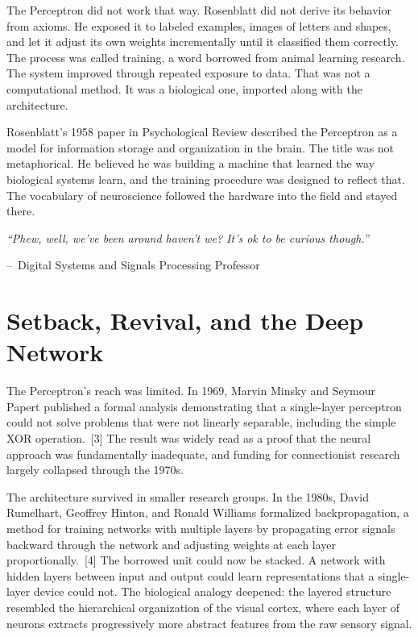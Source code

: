 \documentclass[11pt,a4paper]{article}
\renewenvironment{quote}
  {\list{}{\leftmargin=2.2em\rightmargin=2.2em\topsep=0.4em\parsep=0.3em}%
   \item\relax\itshape}
  {\endlist}
\newcommand{\attrib}[1]{\par\vspace{0.2em}\normalfont\small\hspace*{0em}--\ #1\par}
\begin{document}
The Perceptron did not work that way. Rosenblatt did not derive its behavior from axioms. He exposed it to labeled examples, images of letters and shapes, and let it adjust its own weights incrementally until it classified them correctly. The process was called training, a word borrowed from animal learning research. The system improved through repeated exposure to data. That was not a computational method. It was a biological one, imported along with the architecture.

Rosenblatt's 1958 paper in Psychological Review described the Perceptron as a model for information storage and organization in the brain. The title was not metaphorical. He believed he was building a machine that learned the way biological systems learn, and the training procedure was designed to reflect that. The vocabulary of neuroscience followed the hardware into the field and stayed there.

\begin{quote}
``Phew, well, we've been around haven't we? It's ok to be curious though.''
\attrib{Digital Systems and Signals Processing Professor}
\end{quote}

\section{Setback, Revival, and the Deep Network}

The Perceptron's reach was limited. In 1969, Marvin Minsky and Seymour Papert published a formal analysis demonstrating that a single-layer perceptron could not solve problems that were not linearly separable, including the simple XOR operation.~[3] The result was widely read as a proof that the neural approach was fundamentally inadequate, and funding for connectionist research largely collapsed through the 1970s.

The architecture survived in smaller research groups. In the 1980s, David Rumelhart, Geoffrey Hinton, and Ronald Williams formalized backpropagation, a method for training networks with multiple layers by propagating error signals backward through the network and adjusting weights at each layer proportionally.~[4] The borrowed unit could now be stacked. A network with hidden layers between input and output could learn representations that a single-layer device could not. The biological analogy deepened: the layered structure resembled the hierarchical organization of the visual cortex, where each layer of neurons extracts progressively more abstract features from the raw sensory signal.
\end{document}
